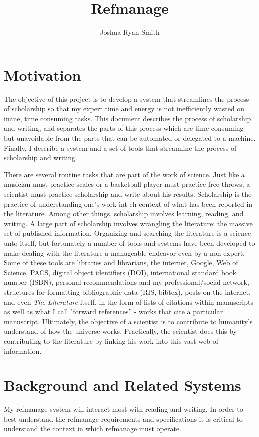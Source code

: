\documentclass[letterpaper,12pt]{article}
\title{Refmanage}
\author{Joshua Ryan Smith}
\begin{document}
\maketitle




\section{Motivation}
The objective of this project is to develop a system that streamlines the process of scholarship so that my expert time and energy is not inefficiently wasted on inane, time consuming tasks. This document describes the process of scholarship and writing, and separates the parts of this process which are time consuming but unavoidable from the parts that can be automated or delegated to a machine. Finally, I describe a system and a set of tools that streamline the process of scholarship and writing. 

There are several routine tasks that are part of the work of science. Just like a musician must practice scales or a basketball player must practice free-throws, a scientist must practice scholarship and write about his results. Scholarship is the practice of understanding one's work int eh context of what has been reported in the literature. Among other things, scholarship involves learning, reading, and writing. A large part of scholarship involves wrangling the literature: the massive set of published information. Organizing and searching the literature is a science unto itself, but fortunately a number of tools and systems have been developed to make dealing with the literature a manageable endeavor even by a non-expert. Some of these tools are libraries and librarians, the internet, Google, Web of Science, PACS, digital object identifiers (DOI), international standard book number (ISBN), personal recommendations and my professional/social network, structures for formatting bibliographic data (RIS, bibtex), posts on the internet, and even \emph{The Literature} itself, in the form of lists of citations within manuscripts as well as what I call "forward references'' - works that cite a particular manuscript. Ultimately, the objective of a scientist is to contribute to humanity's understand of how the universe works. Practically, the scientist does this by contributing to the literature by linking his work into this vast web of information.



\section{Background and Related Systems}
My refmanage system will interact most with reading and writing. In order to best understand the refmanage requirements and specifications it is critical to understand the context in which refmanage must operate.
\end{document}
